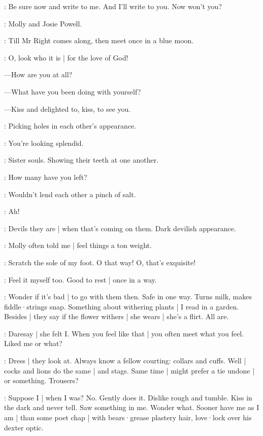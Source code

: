 \BloomOther:
Be sure now and write to me.
And I'll write to you.
Now won't you?

\BloomHist:
Molly and Josie Powell.

\BloomAbstract:
Till Mr Right comes along,
then meet once in a blue moon.


\BloomOther:
O,
look who it is |
for the love of God!

---How are you at all?

---What have you been doing with yourself?

---Kiss and delighted to,
kiss,
to see you.

\BloomAbstract:
Picking holes in each other's appearance.

\BloomOther:
You're looking splendid.

\BloomAbstract:
Sister souls.
Showing their teeth at one another.

\BloomOther:
How many have you left?

\BloomAbstract:
Wouldn't lend each other
a pinch of salt.

\BloomInt:
Ah!

\BloomAbstract:
Devils they are |
when that's coming on them.
Dark devilish appearance.

\BloomHist:
Molly often told me |
feel things a ton weight.

\BloomOther:
Scratch the sole of my foot.
O that way!
O,
that's exquisite!

\BloomHist:
Feel it myself too.
Good to rest |
once in a way.

\BloomAbstract:
Wonder if it's bad |
to go with them then.
Safe in one way.
Turns milk,
makes fiddle·strings snap.
Something about withering plants |
I read in a garden.
Besides |
they say if the flower withers |
she wears |
she's a flirt.
All are.

\BloomCurrent:
Daresay |
she felt I.
When you feel like that |
you often meet what you feel.
Liked me or what?

\BloomAbstract:
Dress |
they look at.
Always know a fellow courting:
collars and cuffs.%
Well |
cocks and lions do the same |
and stags.
Same time |
might prefer a tie undone |
or something.
Trousers?

\BloomCurrent:
Suppose I |
when I was?
No.
Gently does it.
Dislike rough and tumble.
Kiss in the dark
and never tell.
Saw something in me.
Wonder what.
Sooner have me
as I am |
than some poet chap |
with bears·grease plastery hair,
love·lock over his dexter optic.

